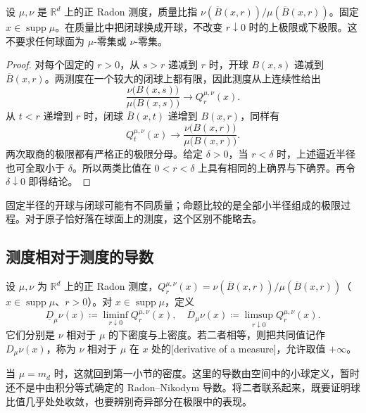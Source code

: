 \begin{proposition}
\label{b1:prop:open-closed-density-ratio}
设 \(\mu,\nu\) 是 \(\mathbb R^d\) 上的正 Radon 测度，质量比指 \(\nu(\overline B(x,r))/\mu(\overline B(x,r))\)。固定 \(x\in\operatorname{supp}\mu\)。在质量比中把闭球换成开球，不改变 \(r\downarrow0\) 时的上极限或下极限。这不要求任何球面为 \(\mu\)-零集或 \(\nu\)-零集。
\end{proposition}
\begin{proof}
对每个固定的 \(r>0\)，从 \(s>r\) 递减到 \(r\) 时，开球 \(B(x,s)\) 递减到 \(\overline B(x,r)\)。两测度在一个较大的闭球上都有限，因此测度从上连续性给出
\[
\frac{\nu\bigl(B(x,s)\bigr)}{\mu\bigl(B(x,s)\bigr)}
\longrightarrow Q_r^{\mu,\nu}(x).
\]
从 \(t<r\) 递增到 \(r\) 时，闭球 \(\overline B(x,t)\) 递增到 \(B(x,r)\)，同样有
\[
Q_t^{\mu,\nu}(x)
\longrightarrow
\frac{\nu\bigl(B(x,r)\bigr)}{\mu\bigl(B(x,r)\bigr)}.
\]
两次取商的极限都有严格正的极限分母。给定 \(\delta>0\)，当 \(r<\delta\) 时，上述逼近半径也可全取小于 \(\delta\)。所以两类比值在 \(0<r<\delta\) 上具有相同的上确界与下确界。再令 \(\delta\downarrow0\) 即得结论。
\end{proof}

固定半径的开球与闭球可能有不同质量；命题比较的是全部小半径组成的极限过程。对于原子恰好落在球面上的测度，这个区别不能略去。

\subsection{测度相对于测度的导数}
\label{b1:subsec:140103}

\begin{definition}
\label{b1:def:relative-density}
设 \(\mu,\nu\) 为 \(\mathbb R^d\) 上的正 Radon 测度，\(Q_r^{\mu,\nu}(x)=\nu(\overline B(x,r))/\mu(\overline B(x,r))\)（\(x\in\operatorname{supp}\mu\)、\(r>0\)）。对 \(x\in\operatorname{supp}\mu\)，定义
\[
\underline D_\mu\nu(x)\coloneqq\liminf_{r\downarrow0}Q_r^{\mu,\nu}(x),
\quad
\overline D_\mu\nu(x)\coloneqq\limsup_{r\downarrow0}Q_r^{\mu,\nu}(x).
\]
它们分别是 \(\nu\) 相对于 \(\mu\) 的下密度与上密度。若二者相等，则把共同值记作 \(D_\mu\nu(x)\)，称为 \(\nu\) 相对于 \(\mu\) 在 \(x\) 处的[derivative of a measure]，允许取值 \(+\infty\)。
\end{definition}

当 \(\mu=m_d\) 时，这就回到第一小节的密度。这里的导数由空间中的小球定义，暂时还不是中由积分等式确定的 Radon--Nikodym 导数。将二者联系起来，既要证明球比值几乎处处收敛，也要辨别奇异部分在极限中的表现。

